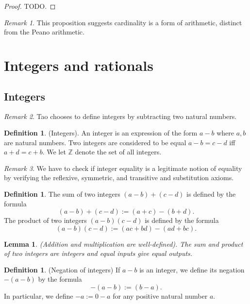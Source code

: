 \documentclass[12pt]{article}
\newtheorem{lemma}[theorem]{Lemma}
\theoremstyle{definition}
\newtheorem{definition}[theorem]{Definition}
\theoremstyle{remark}
\newtheorem*{remark}{Remark}
\begin{document}
\begin{proof}
    TODO.
\end{proof}

\begin{remark}
    This proposition suggests cardinality is a form of arithmetic, distinct from the Peano arithmetic.
\end{remark}

\section{Integers and rationals}

\subsection{Integers}

\begin{remark}
    Tao chooses to define integers by subtracting two natural numbers.
\end{remark}

\begin{definition}
    (Integers). An integer is an expression of the form $a-b$ where $a, b$ are natural numbers. Two integers are considered to be equal $a-b = c-d$ iff $a+d = c+b$. We let $\mathbb{Z}$ denote the set of all integers.
\end{definition}

\begin{remark}
    We have to check if integer equality is a legitimate notion of equality by verifying the reflexive, symmetric, and transitive and substitution axioms.
\end{remark}

\begin{definition}
    The sum of two integers $(a-b) + (c-d)$ is defined by the formula \[
        (a-b) + (c-d) := (a+c) - (b+d)
    .\]
    The product of two integers $(a-b)(c-d)$ is defined by the formula \[
        (a-b)(c-d) := (ac + bd) - (ad + bc)
    .\]
\end{definition}

\begin{lemma}
    (Addition and multiplication are well-defined). The sum and product of two integers are integers and equal inputs give equal outputs.
\end{lemma}

\begin{definition}
    (Negation of integers) If $a-b$ is an integer, we define its negation $-(a-b)$ by the formula \[
        -(a-b) := (b-a)
    .\]
    In particular, we define $-a := 0-a$ for any positive natural number $a$.
\end{definition}
\end{document}
